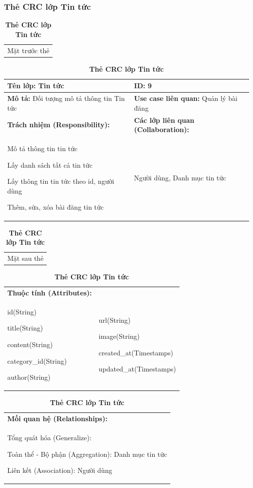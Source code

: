   \subsubsection{Thẻ CRC lớp Tin tức}
  \begin{table}[H]
    \caption{\bfseries \fontsize{12pt}{0pt}\selectfont Thẻ CRC lớp Tin tức}
    \centering
    \begin{tabularx}{0.9\textwidth}{X}
      Mặt trước thẻ
    \end{tabularx}
    \begin{tabularx}{0.9\textwidth}{|X|X|}
      \hline
      \textbf{Tên lớp:} Tin tức & \textbf{ID:} 9 \\
      \hline
      \textbf{Mô tả:} Đối tượng mô tả thông tin Tin tức & \textbf{Use case liên quan:}  Quản lý bài đăng\\
      \hline
      \textbf{Trách nhiệm (Responsibility):} & \textbf{Các lớp liên quan (Collaboration):} \\
      Mô tả thông tin tin tức

      Lấy danh sách tất cả tin tức

      Lấy thông tin tin tức theo id, người dùng

      Thêm, sửa, xóa bài đăng tin tức
      & 
      Người dùng, Danh mục tin tức
      \\
      \hline
    \end{tabularx}
    \begin{tabularx}{0.9\textwidth}{X}
      Mặt sau thẻ
    \end{tabularx}
    \begin{tabularx}{0.9\textwidth}{|X|X|}
      \hline
      \textbf{Thuộc tính (Attributes):} & \\
      id(String) 
      
      title(String)

      content(String)

      category\_id(String)

      author(String) 
      & 
      url(String) 

      image(String) 
            
      created\_at(Timestamps)

      updated\_at(Timestamps)
      \\
      \hline
    \end{tabularx}
    \begin{tabularx}{0.9\textwidth}{|X|}
      \textbf{Mối quan hệ (Relationships):} \\
      Tổng quát hóa (Generalize):

      Toàn thể - Bộ phận (Aggregation): Danh mục tin tức
      
      Liên kết (Association): Người dùng
      \\
      \hline
    \end{tabularx}
  \end{table}

